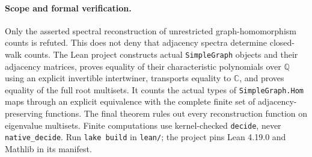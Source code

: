 \documentclass[11pt]{article}
\begin{document}
\paragraph{Scope and formal verification.}
Only the asserted spectral reconstruction of unrestricted graph-homomorphism counts is refuted. This does not deny that adjacency spectra determine closed-walk counts. The Lean project constructs actual \texttt{SimpleGraph} objects and their adjacency matrices, proves equality of their characteristic polynomials over $\mathbb Q$ using an explicit invertible intertwiner, transports equality to $\mathbb C$, and proves equality of the full root multisets. It counts the actual types of \texttt{SimpleGraph.Hom} maps through an explicit equivalence with the complete finite set of adjacency-preserving functions. The final theorem rules out every reconstruction function on eigenvalue multisets. Finite computations use kernel-checked \texttt{decide}, never \texttt{native\_decide}. Run \texttt{lake build} in \texttt{lean/}; the project pins Lean 4.19.0 and Mathlib in its manifest.
\end{document}
